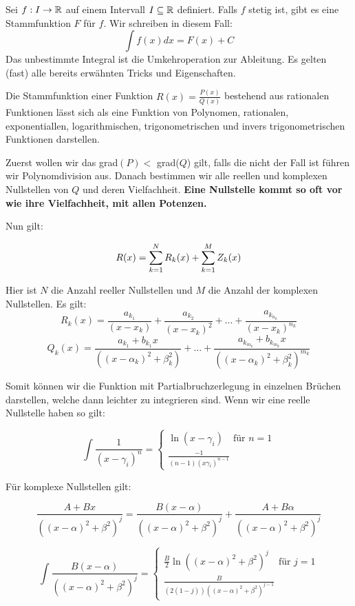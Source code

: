
Sei $f : I \to \mathbb{R}$ auf einem Intervall $I \subseteq \mathbb{R}$ definiert. Falls $f$ stetig ist, gibt es 
eine Stammfunktion $F$ für $f$. Wir schreiben in diesem Fall:
$$\int f(x)dx = F(x) + C$$
Das unbestimmte Integral ist die Umkehroperation zur Ableitung. Es gelten (fast) alle bereits
erwähnten Tricks und Eigenschaften.



Die Stammfunktion einer Funktion $R(x) = \frac{P(x)}{Q(x)}$ bestehend aus rationalen Funktionen
lässt sich als eine Funktion von Polynomen, rationalen, exponentiallen, logarithmischen, 
trigonometrischen und invers trigonometrischen Funktionen darstellen. 

Zuerst wollen wir das grad$(P) < $ grad($Q$) gilt, falls die nicht der Fall ist führen wir 
Polynomdivision aus. Danach bestimmen wir alle reellen und komplexen Nullstellen von $Q$ und deren 
Vielfachheit. \textbf{Eine Nullstelle kommt so oft vor wie ihre Vielfachheit, mit allen Potenzen.}

Nun gilt:

$$R(x) = \sum\limits_{k = 1}^{N} R_k(x) + \sum\limits_{k = 1}^{M} Z_k(x)$$

Hier ist $N$ die Anzahl reeller Nullstellen und $M$ die Anzahl der komplexen Nullstellen. Es gilt:
$$R_k(x) = \frac{a_{k_1}}{(x - x_k)} + \frac{a_{k_2}}{(x - x_k)^2} + ... + \frac{a_{k_{n_k}}}{(x - x_k)^{n_k}}$$
$$Q_k(x) = \frac{a_{k_1} + b_{k_1} x}{((x - \alpha_k)^2 + \beta_k^2)} + ... + \frac{a_{k_{m_k}} + b_{k_{m_k}} x}{((x - \alpha_k)^2 + \beta_k^2)^{m_k}}$$

Somit können wir die Funktion mit Partialbruchzerlegung in einzelnen Brüchen darstellen, welche dann 
leichter zu integrieren sind. Wenn wir eine reelle Nullstelle haben so gilt:

$$\int \frac{1}{(x-\gamma_i)^n} = \begin{cases}
    \ln (x - \gamma_i) \quad \text{für } n = 1 \\
    \frac{-1}{(n-1)(x\gamma_i)^{n-1}}
\end{cases}$$

Für komplexe Nullstellen gilt:

$$\frac{A + Bx}{((x - \alpha)^2 + \beta^2)^j} = \frac{B(x - \alpha)}{((x - \alpha)^2 + \beta^2)^j} + \frac{A + B \alpha}{((x - \alpha)^2 + \beta^2)^j}$$

$$\int \frac{B(x - \alpha)}{((x - \alpha)^2 + \beta^2)^j} = \begin{cases}
    \frac{B}{2}\ln ((x - \alpha)^2 + \beta^2)^j \quad \text{für } j = 1 \\
    \frac{B}{(2(1-j))((x - \alpha)^2 + \beta^2)^{j-1}}
\end{cases}$$


